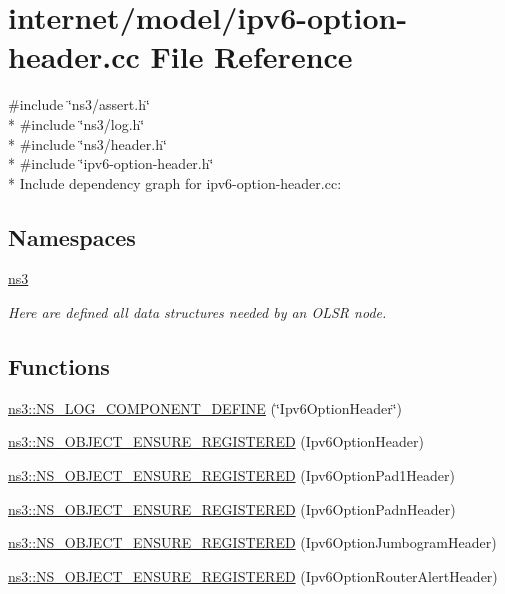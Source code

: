 \hypertarget{ipv6-option-header_8cc}{}\section{internet/model/ipv6-\/option-\/header.cc File Reference}
\label{ipv6-option-header_8cc}
{\ttfamily \#include \char`\"{}ns3/assert.\+h\char`\"{}}\\*
{\ttfamily \#include \char`\"{}ns3/log.\+h\char`\"{}}\\*
{\ttfamily \#include \char`\"{}ns3/header.\+h\char`\"{}}\\*
{\ttfamily \#include \char`\"{}ipv6-\/option-\/header.\+h\char`\"{}}\\*
Include dependency graph for ipv6-\/option-\/header.cc\+:
\subsection*{Namespaces}
\begin{DoxyCompactItemize}
\item 
 \hyperlink{namespacens3}{ns3}
\begin{DoxyCompactList}\small\item\em Here are defined all data structures needed by an O\+L\+SR node. \end{DoxyCompactList}\end{DoxyCompactItemize}
\subsection*{Functions}
\begin{DoxyCompactItemize}
\item 
\hyperlink{namespacens3_ab042572185f1c9089e995268b1f95a66}{ns3\+::\+N\+S\+\_\+\+L\+O\+G\+\_\+\+C\+O\+M\+P\+O\+N\+E\+N\+T\+\_\+\+D\+E\+F\+I\+NE} (\char`\"{}Ipv6\+Option\+Header\char`\"{})
\item 
\hyperlink{namespacens3_a76b164ec53983af3760719f04df0cf06}{ns3\+::\+N\+S\+\_\+\+O\+B\+J\+E\+C\+T\+\_\+\+E\+N\+S\+U\+R\+E\+\_\+\+R\+E\+G\+I\+S\+T\+E\+R\+ED} (Ipv6\+Option\+Header)
\item 
\hyperlink{namespacens3_aca1651097be02a92afc8a0863ab17bc7}{ns3\+::\+N\+S\+\_\+\+O\+B\+J\+E\+C\+T\+\_\+\+E\+N\+S\+U\+R\+E\+\_\+\+R\+E\+G\+I\+S\+T\+E\+R\+ED} (Ipv6\+Option\+Pad1\+Header)
\item 
\hyperlink{namespacens3_a1aa0a9e263cad8e27ed4123bce883786}{ns3\+::\+N\+S\+\_\+\+O\+B\+J\+E\+C\+T\+\_\+\+E\+N\+S\+U\+R\+E\+\_\+\+R\+E\+G\+I\+S\+T\+E\+R\+ED} (Ipv6\+Option\+Padn\+Header)
\item 
\hyperlink{namespacens3_a1dd3e0da649774b95f2bc7ca664c81c0}{ns3\+::\+N\+S\+\_\+\+O\+B\+J\+E\+C\+T\+\_\+\+E\+N\+S\+U\+R\+E\+\_\+\+R\+E\+G\+I\+S\+T\+E\+R\+ED} (Ipv6\+Option\+Jumbogram\+Header)
\item 
\hyperlink{namespacens3_a3ddf0a9ecbbfb6ad86534d79e4befdff}{ns3\+::\+N\+S\+\_\+\+O\+B\+J\+E\+C\+T\+\_\+\+E\+N\+S\+U\+R\+E\+\_\+\+R\+E\+G\+I\+S\+T\+E\+R\+ED} (Ipv6\+Option\+Router\+Alert\+Header)
\end{DoxyCompactItemize}
